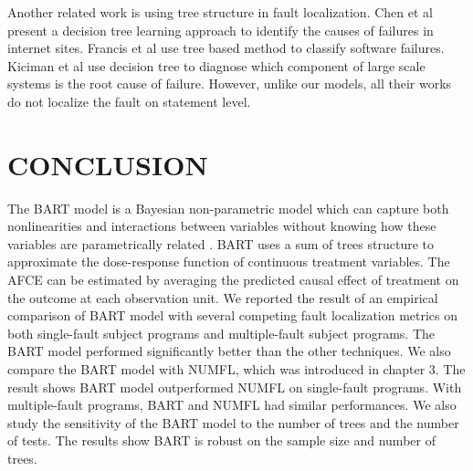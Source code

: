 Another related work is using tree structure in fault localization. Chen et al \cite{chen2004failure} present a decision tree learning approach to identify the causes of failures in internet sites. Francis et al \cite{francis2004tree} use tree based method to classify software failures. Kiciman et al \cite{kiciman2005root} use decision tree to diagnose which component of large scale systems is the root cause of failure. However, unlike our models, all their works do not localize the fault on statement level.

\section{CONCLUSION}\label{BARTconclusion}
The BART model is a Bayesian non-parametric model which can capture both nonlinearities and interactions between variables without knowing how these variables are parametrically related . BART uses a sum of trees structure to approximate the dose-response function of continuous treatment variables. The AFCE can be estimated by averaging the predicted causal effect of treatment on the outcome at each observation unit. We reported the result of an empirical comparison of BART model with several competing fault localization metrics on both single-fault subject programs and multiple-fault subject programs. The BART model performed significantly better than the other techniques. We also compare the BART model with NUMFL, which was introduced in chapter 3. The result shows BART model outperformed NUMFL on single-fault programs. With multiple-fault programs, BART and NUMFL had similar performances.  We also study the sensitivity of the BART model to the number of trees and the number of tests. The results show BART is robust on the sample size and number of trees.   